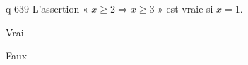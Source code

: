 \begin{truefalse}{q-639}
L'assertion « $x\geq 2 \Rightarrow x \geq 3$ » est vraie si $x=1$.
\item* Vrai
\item Faux
\end{truefalse}

